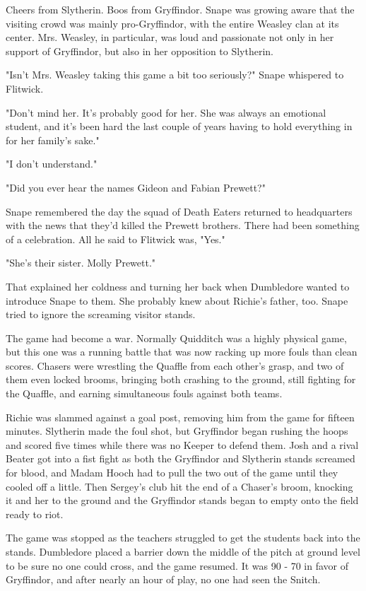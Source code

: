 \documentclass[a4paper,11pt]{article}
\begin{document}
Cheers from Slytherin. Boos from Gryffindor. Snape was growing aware that the visiting crowd was mainly pro-Gryffindor, with the entire Weasley clan at its center. Mrs. Weasley, in particular, was loud and passionate not only in her support of Gryffindor, but also in her opposition to Slytherin.

"Isn't Mrs. Weasley taking this game a bit too seriously?" Snape whispered to Flitwick.

"Don't mind her. It's probably good for her. She was always an emotional student, and it's been hard the last couple of years having to hold everything in for her family's sake."

"I don't understand."

"Did you ever hear the names Gideon and Fabian Prewett?"

Snape remembered the day the squad of Death Eaters returned to headquarters with the news that they'd killed the Prewett brothers. There had been something of a celebration. All he said to Flitwick was, "Yes."

"She's their sister. Molly Prewett."

That explained her coldness and turning her back when Dumbledore wanted to introduce Snape to them. She probably knew about Richie's father, too. Snape tried to ignore the screaming visitor stands.

The game had become a war. Normally Quidditch was a highly physical game, but this one was a running battle that was now racking up more fouls than clean scores. Chasers were wrestling the Quaffle from each other's grasp, and two of them even locked brooms, bringing both crashing to the ground, still fighting for the Quaffle, and earning simultaneous fouls against both teams.

Richie was slammed against a goal post, removing him from the game for fifteen minutes. Slytherin made the foul shot, but Gryffindor began rushing the hoops and scored five times while there was no Keeper to defend them. Josh and a rival Beater got into a fist fight as both the Gryffindor and Slytherin stands screamed for blood, and Madam Hooch had to pull the two out of the game until they cooled off a little. Then Sergey's club hit the end of a Chaser's broom, knocking it and her to the ground and the Gryffindor stands began to empty onto the field ready to riot.

The game was stopped as the teachers struggled to get the students back into the stands. Dumbledore placed a barrier down the middle of the pitch at ground level to be sure no one could cross, and the game resumed. It was 90 - 70 in favor of Gryffindor, and after nearly an hour of play, no one had seen the Snitch.
\end{document}
